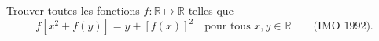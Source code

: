 Trouver toutes les fonctions $f : \mathbb{R} \mapsto \mathbb{R}$ telles que
\[ f\left[x^2 + f(y)\right] = y + [f(x)]^2 \quad\text{pour tous } x, y \in \mathbb{R} \qquad \text{(IMO 1992).} \]
